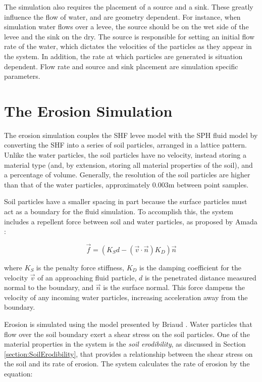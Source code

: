 The simulation also requires the placement of a source and a sink. These greatly influence the flow of water, and are geometry dependent. For instance, when simulation water flows over a levee, the source should be on the wet side of the levee and the sink on the dry. The source is responsible for setting an initial flow rate of the water, which dictates the velocities of the particles as they appear in the system. In addition, the rate at which particles are generated is situation dependent. Flow rate and source and sink placement are simulation specific parameters.


\section{The Erosion Simulation}

The erosion simulation couples the SHF levee model with the SPH fluid model by converting the SHF into a series of soil particles, arranged in a lattice pattern. Unlike the water particles, the soil particles have no velocity, instead storing a material type (and, by extension, storing all material properties of the soil), and a percentage of volume. Generally, the resolution of the soil particles are higher than that of the water particles, approximately 0.003m between point samples. 

Soil particles have a smaller spacing in part because the surface particles must act as a boundary for the fluid simulation. To accomplish this, the system includes a repellent force between soil and water particles, as proposed by Amada \cite{amada-particles}:

\begin{equation}
  \vec{f} = \left( K_{S} d - \left( \vec{v} \cdot \vec{n} \right) K_{D} \right) \vec{n}
\end{equation}

\noindent where $K_{S}$ is the penalty force stiffness, $K_{D}$ is the damping coefficient for the velocity
$\vec{v}$ of an approaching fluid particle, $d$ is the penetrated distance measured normal to the
boundary, and $\vec{n}$ is the surface normal. 
This force dampens the velocity of any incoming water particles, increasing acceleration away from the boundary. 

Erosion is simulated using the model presented by Briaud \cite{Briaud-ErosionByOvertopping}. Water particles that flow over the soil boundary exert a shear stress on the soil particles. One of the material properties in the system is the \emph{soil erodibility}, as discussed in Section \ref{section:SoilErodibility}, that provides a relationship between the shear stress on the soil and its rate of erosion. The system calculates the rate of erosion by the equation:

